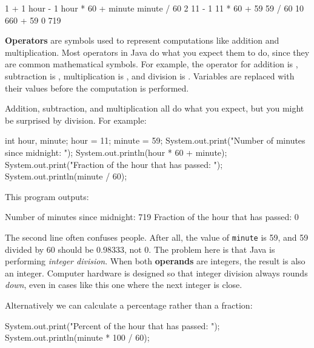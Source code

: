 \begin{code}
    1 + 1     hour - 1     hour * 60 + minute     minute / 60
    2         11 - 1       11 * 60 + 59           59 / 60
              10           660 + 59               0
                           719
\end{code}


{\bf Operators} are symbols used to represent computations like addition and multiplication.
Most operators in Java do what you expect them to do, since they are common mathematical symbols.
For example, the operator for addition is \java{+}, subtraction is \java{-}, multiplication is \java{*}, and division is \java{/}.
Variables are replaced with their values before the computation is performed.

Addition, subtraction, and multiplication all do what you expect, but you might be surprised by division.
For example:

\begin{code}
    int hour, minute;
    hour = 11;
    minute = 59;
    System.out.print("Number of minutes since midnight: ");
    System.out.println(hour * 60 + minute);
    System.out.print("Fraction of the hour that has passed: ");
    System.out.println(minute / 60);
\end{code}

This program outputs:

\begin{stdout}
Number of minutes since midnight: 719
Fraction of the hour that has passed: 0
\end{stdout}


The second line often confuses people.
After all, the value of {\tt minute} is 59, and 59 divided by 60 should be 0.98333, not 0.
The problem here is that Java is performing {\em integer division}.
When both {\bf operands} are integers, the result is also an integer.
Computer hardware is designed so that integer division always rounds {\em down}, even in cases like this one where the next integer is close.

Alternatively we can calculate a percentage rather than a fraction:

\begin{code}
    System.out.print("Percent of the hour that has passed: ");
    System.out.println(minute * 100 / 60);
\end{code}

